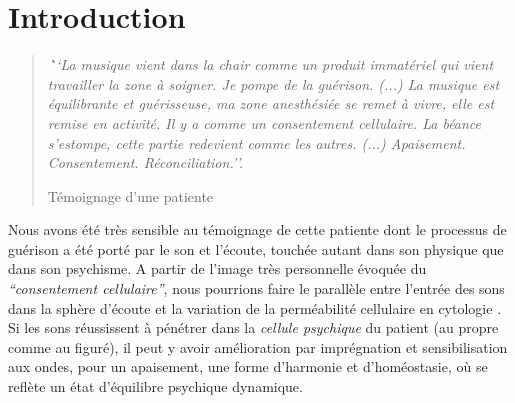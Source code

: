 
\chapter{Introduction}





\begin{quotation}
 \textit{\textbf ``La musique vient dans la chair comme un produit immatériel
 qui vient travailler la zone à soigner. Je pompe de la
 guérison.
 (...)
 La musique est équilibrante et guérisseuse, ma zone
 anesthésiée se remet à vivre, elle est remise en activité.
 Il y a comme un consentement cellulaire.
La béance s'estompe, cette
partie redevient comme les autres. (...)
Apaisement. Consentement. Réconciliation.''.}

Témoignage d'une patiente

\end{quotation}



Nous avons été très sensible au témoignage de cette patiente dont le
processus de guérison a été porté par le son et l'écoute, touchée
autant dans son physique
que dans son psychisme.
A partir de l'image très personnelle évoquée du
\textit{``consentement cellulaire''}, nous pourrions faire le
parallèle entre l'entrée des sons dans la sphère d'écoute et la variation de la
perméabilité cellulaire en cytologie \autocite[70--76]{marieb:biologie}. Si les sons réussissent à pénétrer dans la
\textit{cellule psychique} du patient (au propre comme au figuré),  il peut y avoir amélioration par imprégnation et sensibilisation aux ondes, pour un apaisement, une forme d'harmonie et d'homéostasie,  \autocite[10]{marieb:biologie} où se reflète un état d'équilibre psychique dynamique.

